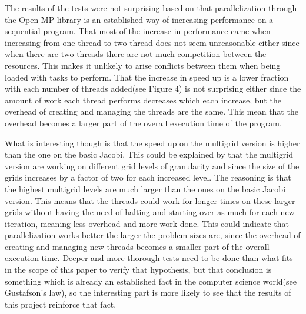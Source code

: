 \documentclass{article}
\begin{document}
The results of the tests were not surprising based on that parallelization through the Open MP library is an established way of increasing performance on a sequential program. That most of the increase in performance came when increasing from one thread to two thread does not seem unreasonable either since when there are two threads there are not much competition between the resources. This makes it unlikely to arise conflicts between them when being loaded with tasks to perform. That the increase in speed up is a lower fraction with each number of threads added(see Figure 4) is not surprising either since the amount of work each thread performs decreases which each increase, but the overhead of creating and managing the threads are the same. This mean that the overhead becomes a larger part of the overall execution time of the program. 

What is interesting though is that the speed up on the multigrid version is higher than the one on the basic Jacobi. This could be explained by that the multigrid version are working on different grid levels of granularity and since the size of the grids increases by a factor of two for each increased level. The reasoning is that the highest multigrid levels are much larger than the ones on the basic Jacobi version. This means that the threads could work for longer times on these larger grids without having the need of halting and starting over as much for each new iteration, meaning less overhead and more work done. This could indicate that parallelization works better the larger the problem sizes are, since the overhead of creating and managing new threads becomes a smaller part of the overall execution time. Deeper and more thorough tests need to be done than what fits in the scope of this paper to verify that hypothesis, but that conclusion is something which is already an established fact in the computer science world(see Gustafson’s law), so the interesting part is more likely to see that the results of this project reinforce that fact. 
\end{document}

